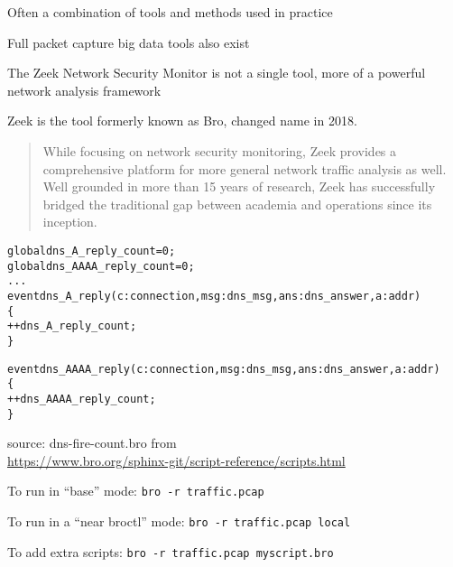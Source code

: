 \documentclass[Screen16to9,17pt]{foils}
\begin{document}
\vskip 5mm
\centerline{Often a combination of tools and methods used in practice}

Full packet capture big data tools also exist





The Zeek Network Security Monitor is not a single tool, more of a
powerful network analysis framework

Zeek is the tool formerly known as Bro, changed name in 2018. 





\begin{quote}
While focusing on network security monitoring, Zeek provides a comprehensive platform for more general network traffic analysis as well. Well grounded in more than 15 years of research, Zeek has successfully bridged the traditional gap between academia and operations since its inception.
\end{quote}






\begin{alltt}\small
global dns_A_reply_count=0;
global dns_AAAA_reply_count=0;
...
event dns_A_reply(c: connection, msg: dns_msg, ans: dns_answer, a: addr)
        \{
        ++dns_A_reply_count;
        \}

event dns_AAAA_reply(c: connection, msg: dns_msg, ans: dns_answer, a: addr)
        \{
        ++dns_AAAA_reply_count;
        \}
\end{alltt}

source: dns-fire-count.bro from\\
{\small {}
\url{https://www.bro.org/sphinx-git/script-reference/scripts.html}}



\begin{list1}
\item To run in “base” mode:
 \verb+bro -r traffic.pcap+
\item To run in a “near broctl” mode:
\verb+bro -r traffic.pcap local+
\item To add extra scripts:
\verb+bro -r traffic.pcap myscript.bro+
\end{list1}
\end{document}
